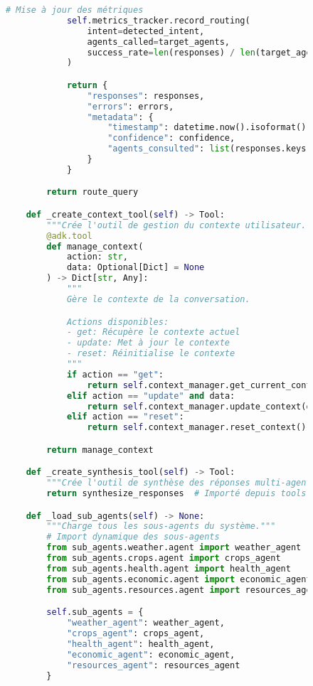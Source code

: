 \begin{figure}[h]
\begin{lstlisting}[language=Python, caption=Structure complète de l'agent principal]
            # Mise à jour des métriques
            self.metrics_tracker.record_routing(
                intent=detected_intent,
                agents_called=target_agents,
                success_rate=len(responses) / len(target_agents) if target_agents else 0
            )

            return {
                "responses": responses,
                "errors": errors,
                "metadata": {
                    "timestamp": datetime.now().isoformat(),
                    "confidence": confidence,
                    "agents_consulted": list(responses.keys())
                }
            }

        return route_query

    def _create_context_tool(self) -> Tool:
        """Crée l'outil de gestion du contexte utilisateur."""
        @adk.tool
        def manage_context(
            action: str,
            data: Optional[Dict] = None
        ) -> Dict[str, Any]:
            """
            Gère le contexte de la conversation.

            Actions disponibles:
            - get: Récupère le contexte actuel
            - update: Met à jour le contexte
            - reset: Réinitialise le contexte
            """
            if action == "get":
                return self.context_manager.get_current_context()
            elif action == "update" and data:
                return self.context_manager.update_context(data)
            elif action == "reset":
                return self.context_manager.reset_context()

        return manage_context

    def _create_synthesis_tool(self) -> Tool:
        """Crée l'outil de synthèse des réponses multi-agents."""
        return synthesize_responses  # Importé depuis tools.py

    def _load_sub_agents(self) -> None:
        """Charge tous les sous-agents du système."""
        # Import dynamique des sous-agents
        from sub_agents.weather.agent import weather_agent
        from sub_agents.crops.agent import crops_agent
        from sub_agents.health.agent import health_agent
        from sub_agents.economic.agent import economic_agent
        from sub_agents.resources.agent import resources_agent

        self.sub_agents = {
            "weather_agent": weather_agent,
            "crops_agent": crops_agent,
            "health_agent": health_agent,
            "economic_agent": economic_agent,
            "resources_agent": resources_agent
        }


\end{lstlisting}
\end{figure}
